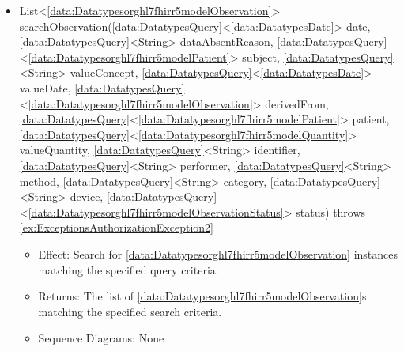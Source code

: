 \begin{description}
\begin{itemize}[noitemsep,nolistsep,leftmargin=-.25cm]
\begin{itemize}[noitemsep,nolistsep]
           \item Sequence Diagrams: \cref{diag:Interaction:P1UC8UpdateRiskLevelEHRForward}
        \end{itemize}
      \item \textsf{List\textless{}\ref{data:Datatypesorghl7fhirr5modelObservation}\textgreater{} searchObservation(\ref{data:DatatypesQuery}\textless{}\ref{data:DatatypesDate}\textgreater{} date, \ref{data:DatatypesQuery}\textless{}String\textgreater{} dataAbsentReason, \ref{data:DatatypesQuery}\textless{}\ref{data:Datatypesorghl7fhirr5modelPatient}\textgreater{} subject, \ref{data:DatatypesQuery}\textless{}String\textgreater{} valueConcept, \ref{data:DatatypesQuery}\textless{}\ref{data:DatatypesDate}\textgreater{} valueDate, \ref{data:DatatypesQuery}\textless{}\ref{data:Datatypesorghl7fhirr5modelObservation}\textgreater{} derivedFrom, \ref{data:DatatypesQuery}\textless{}\ref{data:Datatypesorghl7fhirr5modelPatient}\textgreater{} patient, \ref{data:DatatypesQuery}\textless{}\ref{data:Datatypesorghl7fhirr5modelQuantity}\textgreater{} valueQuantity, \ref{data:DatatypesQuery}\textless{}String\textgreater{} identifier, \ref{data:DatatypesQuery}\textless{}String\textgreater{} performer, \ref{data:DatatypesQuery}\textless{}String\textgreater{} method, \ref{data:DatatypesQuery}\textless{}String\textgreater{} category, \ref{data:DatatypesQuery}\textless{}String\textgreater{} device, \ref{data:DatatypesQuery}\textless{}\ref{data:Datatypesorghl7fhirr5modelObservationStatus}\textgreater{} status) throws \ref{ex:ExceptionsAuthorizationException2}}
        \begin{itemize}[noitemsep,nolistsep]
           \item Effect: Search for \ref{data:Datatypesorghl7fhirr5modelObservation} instances matching the specified query criteria. 
           \item Returns: The list of \ref{data:Datatypesorghl7fhirr5modelObservation}s matching the specified search criteria.
           \item Sequence Diagrams: None
        \end{itemize}

\end{itemize}
\end{description}
